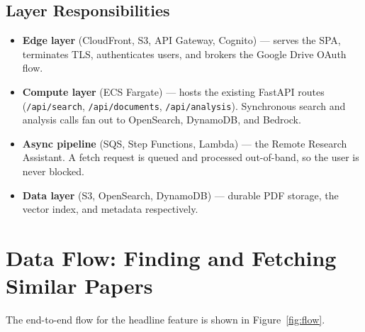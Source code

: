 \documentclass[12pt,a4paper]{article}
\begin{document}
\subsection{Layer Responsibilities}
\begin{itemize}[leftmargin=2em, nosep]
    \item \textbf{Edge layer} (CloudFront, S3, API Gateway, Cognito) ---
          serves the SPA, terminates TLS, authenticates users, and brokers
          the Google Drive OAuth flow.
    \item \textbf{Compute layer} (ECS Fargate) --- hosts the existing FastAPI
          routes (\texttt{/api/search}, \texttt{/api/documents},
          \texttt{/api/analysis}). Synchronous search and analysis calls fan
          out to OpenSearch, DynamoDB, and Bedrock.
    \item \textbf{Async pipeline} (SQS, Step Functions, Lambda) --- the
          Remote Research Assistant. A fetch request is queued and processed
          out-of-band, so the user is never blocked.
    \item \textbf{Data layer} (S3, OpenSearch, DynamoDB) --- durable PDF
          storage, the vector index, and metadata respectively.
\end{itemize}

\section{Data Flow: Finding and Fetching Similar Papers}

The end-to-end flow for the headline feature is shown in
Figure~\ref{fig:flow}.
\end{document}
